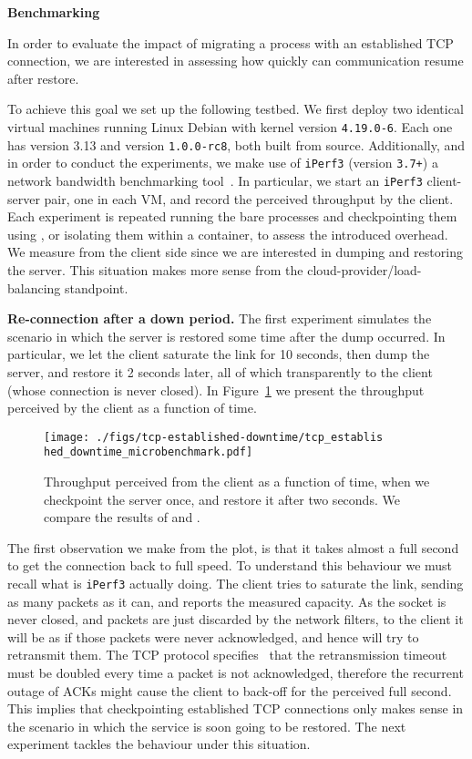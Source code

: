 \textbf{Benchmarking}

In order to evaluate the impact of migrating a process with an established TCP
connection, we are interested in assessing how quickly can communication resume
after restore.

To achieve this goal we set up the following testbed.
We first deploy two identical virtual machines running Linux Debian with kernel
version \texttt{4.19.0-6}.
Each one has \criu version 3.13 and \runc version \texttt{1.0.0-rc8}, both
built from source.
Additionally, and in order to conduct the experiments, we make use of
\texttt{iPerf3} (version \texttt{3.7+}) a network bandwidth benchmarking
tool~\cite{iperf3}.
In particular, we start an \texttt{iPerf3} client-server pair, one in each VM,
and record the perceived throughput by the client.
Each experiment is repeated running the bare processes and checkpointing them
using \criu, or isolating them within a \runc container, to assess the
introduced overhead.
We measure from the client side since we are interested in dumping and
restoring the server.
This situation makes more sense from the cloud-provider/load-balancing
standpoint.

\textbf{Re-connection after a down period.}
The first experiment simulates the scenario in which the server is restored
some time after the dump occurred.
In particular, we let the client saturate the link for 10 seconds, then dump
the server, and restore it 2 seconds later, all of which transparently to the
client (whose connection is never closed).
In Figure~\ref{fig:evaluation-downtime} we present the throughput perceived by
the client as a function of time.
\begin{figure}[h!]
    \centering

    \texttt{[image: ./figs/tcp-established-downtime/tcp\_establis
        hed\_downtime\_microbenchmark.pdf]}
    \caption[Throughput over time after a long off period]{Throughput perceived
        from the client as a function of time, when we checkpoint the server
        once, and
        restore it after two seconds.
        We compare the results of \criu and \runc.
        \label{fig:evaluation-downtime}}
\end{figure}
The first observation we make from the plot, is that it takes almost a full
second to get the connection back to full speed.
To understand this behaviour we must recall what is \texttt{iPerf3} actually
doing.
The client tries to saturate the link, sending as many packets as it can, and
reports the measured capacity.
As the socket is never closed, and packets are just discarded by the network
filters, to the client it will be as if those packets were never acknowledged,
and hence will try to retransmit them.
The TCP protocol specifies~\cite{tcp-rfc} that the retransmission timeout must
be doubled every time a packet is not acknowledged, therefore the recurrent
outage of ACKs might cause the client to back-off for the perceived full
second.
This implies that checkpointing established TCP connections only makes sense in
the scenario in which the service is soon going to be restored.
The next experiment tackles the behaviour under this situation.

